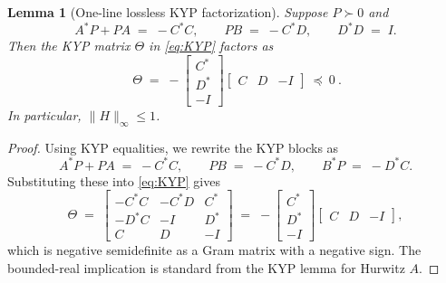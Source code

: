 \documentclass[11pt]{article}
\newtheorem{lemma}[theorem]{Lemma}
\theoremstyle{definition}
\theoremstyle{remark}
\begin{document}
\begin{lemma}[One-line lossless KYP factorization]\label{lem:losslessKYP}
Suppose \(P\succ 0\) and
\begin{equation}\label{eq:lossless-equalities}
 A^*P+PA\;=\;-C^*C,\qquad PB\;=\;-C^*D,\qquad D^*D\;=\;I.
\end{equation}
Then the KYP matrix \(\Theta\) in \eqref{eq:KYP} factors as
\begin{equation}\label{eq:one-line-factor}
 \boxed{\ \Theta\;=\;-\begin{bmatrix}C^*\\ D^*\\ -I\end{bmatrix}\!\begin{bmatrix}C & D & -I\end{bmatrix}\ \preceq\ 0\ }.
\end{equation}
In particular, \(\|H\|_\infty\le 1\).
\end{lemma}
\begin{proof}
Using KYP equalities, we rewrite the KYP blocks as
\[
 A^*P+PA\;=\;-C^*C,\qquad PB\;=\;-C^*D,\qquad B^*P\;=\;-D^*C.
\]
Substituting these into \eqref{eq:KYP} gives
\[
 \Theta\;=\;\begin{bmatrix}
  -C^*C & -C^*D & C^*\\
  -D^*C & -I & D^*\\
  C & D & -I
 \end{bmatrix}\;=\;-\begin{bmatrix}C^*\\ D^*\\ -I\end{bmatrix}\!\begin{bmatrix}C & D & -I\end{bmatrix},
\]
which is negative semidefinite as a Gram matrix with a negative sign. The bounded-real implication is standard from the KYP lemma for Hurwitz \(A\).
\end{proof}
\end{document}
